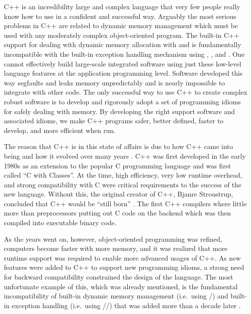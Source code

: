 \documentclass[pdf,ps2pdf,11pt]{SANDreport}
\begin{document}
C++ is an incredibility large and complex language that very few
people really know how to use in a confident and successful way.
Arguably the most serious problems in C++ are related to dynamic
memory management which must be used with any moderately complex
object-oriented program.  The built-in C++ support for dealing with
dynamic memory allocation with {} and {} is
fundamentally incompatible with the built-in exception handling
mechanism using {}, {}, and
{}.  One cannot effectively build large-scale integrated
software using just these low-level language features at the
application programming level.  Software developed this way segfaults
and leaks memory unpredictably and is nearly impossible to integrate
with other code.  The only successful way to use C++ to create complex
robust software is to develop and rigorously adopt a set of
programming idioms for safely dealing with memory.  By developing the
right support software and associated idioms, we make C++ programs
safer, better defined, faster to develop, and more efficient when run.

The reason that C++ is in this state of affairs is due to how C++ came
into being and how it evolved over many years {}\cite{stroustrup94,
stroustrup07}.  C++ was first developed in the early 1980s as an
extension to the popular C programming language and was first called
``C with Classes''.  At the time, high efficiency, very low runtime
overhead, and strong compatibility with C were critical requirements
to the success of the new language.  Without this, the original
creator of C++, Bjanre Stroustrup, concluded that C++ would be ``still
born'' {}\cite{stroustrup97}.  The first C++ compilers where little
more than preprocessors putting out C code on the backend which was
then compiled into executable binary code.

As the years went on, however, object-oriented programming was
refined, computers become faster with more memory, and it was realized
that more runtime support was required to enable more advanced usages
of C++.  As new features were added to C++ to support new programming
idioms, a strong need for backward compatibility constrained the
design of the language.  The most unfortunate example of this, which
was already mentioned, is the fundamental incompatibility of built-in
dynamic memory management (i.e.\ using
{}/{}) and built-in exception handling
(i.e.\ using {}/{}/{}) that
was added more than a decade later {}\cite{stroustrup94}.
\end{document}
